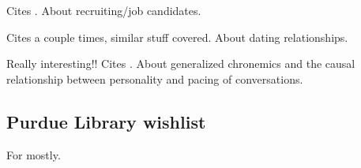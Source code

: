 \documentclass[
]{article}
\begin{document}
\textbf{}

Cites \textcite{walther95}. About recruiting/job candidates.

\textbf{}

Cites \textcite{walther95} a couple times, similar stuff covered. About
dating relationships.

\textbf{}

Really interesting!! Cites \textcite{walther95}. About generalized
chronemics and the causal relationship between personality and pacing of
conversations.

\hypertarget{purdue-library-wishlist}{%
\subsection{Purdue Library wishlist}\label{purdue-library-wishlist}}


For \textcite{doring09} mostly.

\printbibliography
\end{document}
